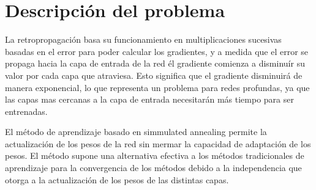 




















\section{Descripción del problema}
La retropropagación basa su funcionamiento en multiplicaciones sucesivas basadas en el error para poder calcular los gradientes, y a medida que el error se propaga hacia la capa de entrada de la red él gradiente comienza a disminuír su valor por cada capa que atraviesa. Esto significa que el gradiente disminuirá de manera exponencial, lo que representa un problema para redes profundas, ya que las capas mas cercanas a la capa de entrada necesitarán más tiempo para ser entrenadas.

El método de aprendizaje basado en simmulated annealing permite la actualización de los pesos de la red sin mermar la capacidad de adaptación de los pesos. El método supone una alternativa efectiva a los métodos tradicionales de aprendizaje para la convergencia de los métodos debido a la independencia que otorga a la actualización de los pesos de las distintas capas.

